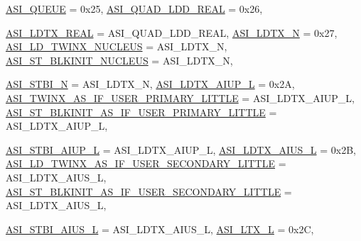 \begin{DoxyCompactItemize}
\hyperlink{namespaceSparcISA_a6dd43f1311515252b283f56d7095a1f3ad4d4afc40a6d7eb77ef1a442ab9017a6}{ASI\_\-QUEUE} =  0x25, 
\hyperlink{namespaceSparcISA_a6dd43f1311515252b283f56d7095a1f3a2a804cb45bff869d0d831d4dbe2119b2}{ASI\_\-QUAD\_\-LDD\_\-REAL} =  0x26, 
\par
\hyperlink{namespaceSparcISA_a6dd43f1311515252b283f56d7095a1f3aaa18842cbf21dca186307a81af01f77b}{ASI\_\-LDTX\_\-REAL} =  ASI\_\-QUAD\_\-LDD\_\-REAL, 
\hyperlink{namespaceSparcISA_a6dd43f1311515252b283f56d7095a1f3a2de75f7569dd8a51ffb1bf916207fd37}{ASI\_\-LDTX\_\-N} =  0x27, 
\hyperlink{namespaceSparcISA_a6dd43f1311515252b283f56d7095a1f3a61389f49147eb7a8de95e92c2e891ddb}{ASI\_\-LD\_\-TWINX\_\-NUCLEUS} =  ASI\_\-LDTX\_\-N, 
\hyperlink{namespaceSparcISA_a6dd43f1311515252b283f56d7095a1f3aab36bd26da491a935e00561c721d8908}{ASI\_\-ST\_\-BLKINIT\_\-NUCLEUS} =  ASI\_\-LDTX\_\-N, 
\par
\hyperlink{namespaceSparcISA_a6dd43f1311515252b283f56d7095a1f3af8e8430c9af101e12e9ccd93adde2dc8}{ASI\_\-STBI\_\-N} =  ASI\_\-LDTX\_\-N, 
\hyperlink{namespaceSparcISA_a6dd43f1311515252b283f56d7095a1f3a2a5847886199a722e6e2a7907b047879}{ASI\_\-LDTX\_\-AIUP\_\-L} =  0x2A, 
\hyperlink{namespaceSparcISA_a6dd43f1311515252b283f56d7095a1f3a1c806ee02becd69093b5774e775487ec}{ASI\_\-TWINX\_\-AS\_\-IF\_\-USER\_\-PRIMARY\_\-LITTLE} =  ASI\_\-LDTX\_\-AIUP\_\-L, 
\hyperlink{namespaceSparcISA_a6dd43f1311515252b283f56d7095a1f3a1e8bba3c90156bf800b4466ce10b864c}{ASI\_\-ST\_\-BLKINIT\_\-AS\_\-IF\_\-USER\_\-PRIMARY\_\-LITTLE} =  ASI\_\-LDTX\_\-AIUP\_\-L, 
\par
\hyperlink{namespaceSparcISA_a6dd43f1311515252b283f56d7095a1f3ad00fa339c2dfc6bdcf87bab8c4fd3201}{ASI\_\-STBI\_\-AIUP\_\-L} =  ASI\_\-LDTX\_\-AIUP\_\-L, 
\hyperlink{namespaceSparcISA_a6dd43f1311515252b283f56d7095a1f3ac43d9f8a3a1a1fef502ec2d294deb829}{ASI\_\-LDTX\_\-AIUS\_\-L} =  0x2B, 
\hyperlink{namespaceSparcISA_a6dd43f1311515252b283f56d7095a1f3aebbbf4ac075cfb3a9a4c1ef18522dc1c}{ASI\_\-LD\_\-TWINX\_\-AS\_\-IF\_\-USER\_\-SECONDARY\_\-LITTLE} =  ASI\_\-LDTX\_\-AIUS\_\-L, 
\hyperlink{namespaceSparcISA_a6dd43f1311515252b283f56d7095a1f3a08b0e949c44a997ea7a8de5ab0afad18}{ASI\_\-ST\_\-BLKINIT\_\-AS\_\-IF\_\-USER\_\-SECONDARY\_\-LITTLE} =  ASI\_\-LDTX\_\-AIUS\_\-L, 
\par
\hyperlink{namespaceSparcISA_a6dd43f1311515252b283f56d7095a1f3a9581f3bb14faa6f5e6502b2952605daa}{ASI\_\-STBI\_\-AIUS\_\-L} =  ASI\_\-LDTX\_\-AIUS\_\-L, 
\hyperlink{namespaceSparcISA_a6dd43f1311515252b283f56d7095a1f3a2fc3fc03e421f78e27954a56fa5b199e}{ASI\_\-LTX\_\-L} =  0x2C, 

\end{DoxyCompactItemize}
